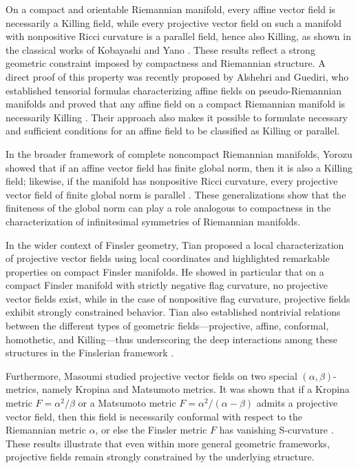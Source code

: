 \documentclass[10pt]{article}
\begin{document}
On a compact and orientable Riemannian manifold, every affine vector field is necessarily a Killing field, while every projective vector field on such a manifold with nonpositive Ricci curvature is a parallel field, hence also Killing, as shown in the classical works of Kobayashi and Yano \cite{kobayashi,yano}. These results reflect a strong geometric constraint imposed by compactness and Riemannian structure. A direct proof of this property was recently proposed by Alshehri and Guediri, who established tensorial formulas characterizing affine fields on pseudo-Riemannian manifolds and proved that any affine field on a compact Riemannian manifold is necessarily Killing \cite{alshehri2024}. Their approach also makes it possible to formulate necessary and sufficient conditions for an affine field to be classified as Killing or parallel.

In the broader framework of complete noncompact Riemannian manifolds, Yorozu showed that if an affine vector field has finite global norm, then it is also a Killing field; likewise, if the manifold has nonpositive Ricci curvature, every projective vector field of finite global norm is parallel \cite{yorozu}. These generalizations show that the finiteness of the global norm can play a role analogous to compactness in the characterization of infinitesimal symmetries of Riemannian manifolds.

In the wider context of Finsler geometry, Tian proposed a local characterization of projective vector fields using local coordinates and highlighted remarkable properties on compact Finsler manifolds. He showed in particular that on a compact Finsler manifold with strictly negative flag curvature, no projective vector fields exist, while in the case of nonpositive flag curvature, projective fields exhibit strongly constrained behavior. Tian also established nontrivial relations between the different types of geometric fields---projective, affine, conformal, homothetic, and Killing---thus underscoring the deep interactions among these structures in the Finslerian framework \cite{tian2014}.

Furthermore, Masoumi studied projective vector fields on two special $(\alpha,\beta)$-metrics, namely Kropina and Matsumoto metrics. It was shown that if a Kropina metric $F = \alpha^2/\beta$ or a Matsumoto metric $F = \alpha^2/(\alpha - \beta)$ admits a projective vector field, then this field is necessarily conformal with respect to the Riemannian metric $\alpha$, or else the Finsler metric $F$ has vanishing S-curvature \cite{masoumi2020}. These results illustrate that even within more general geometric frameworks, projective fields remain strongly constrained by the underlying structure.
\end{document}
